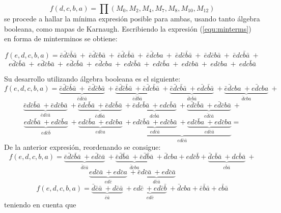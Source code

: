 \documentclass[a4paper]{article}
\begin{document}
\begin{equation}
f \left( d,c,b,a \right) = \prod \left( M_0,M_2,M_4,M_7,M_8,M_{10},M_{12} \right)
\label{equ:maxterms}
\end{equation}
se procede a hallar la mínima expresión posible para ambas, usando tanto álgebra booleana, como mapas de Karnaugh.
Escribiendo la expresión (\ref{equ:minterms}) en forma de minterminos se obtiene:
\begin{center}
\[
	f \left( e,d,c,b,a \right) = \bar{e}\bar{d}\bar{c}\bar{b}\bar{a} \ + \ \bar{e}\bar{d}\bar{c}b\bar{a} \ + \ \bar{e}\bar{d}c\bar{b}\bar{a} \ + \ \bar{e}\bar{d}cba \ + \ \bar{e}d\bar{c}\bar{b}\bar{a} \ + \ \bar{e}d\bar{c}b\bar{a} \ + \ \bar{e}dc\bar{b}\bar{a} \ +
\]
\[
	e\bar{d}\bar{c}\bar{b}\bar{a} \ + \ e\bar{d}\bar{c}b\bar{a} \ + \ e\bar{d}c\bar{b}\bar{a} \ + \ e\bar{d}cba \ + \ ed\bar{c}\bar{b}\bar{a}\ + \ ed\bar{c}\bar{b}a \ + \ ed\bar{c}b\bar{a} \ + \ ed\bar{c}ba \ + \ edc\bar{b}\bar{a} 
\]

Su desarrollo utilizando álgebra booleana es el siguiente:
\[
	f \left( e,d,c,b,a \right) = \underbrace{\bar{e}\bar{d}\bar{c}\bar{b}\bar{a} \ + \ \bar{e}\bar{d}\bar{c}b\bar{a} }_{\bar{e}\bar{d}\bar{c}\bar{a}}\ + 							\underbrace{\bar{e}\bar{d}\bar{c}\bar{b}\bar{a} \ + \bar{e}\bar{d}c\bar{b}  \bar{a}  }_{\bar{e}\bar{d}\bar{b}\bar{a}}\  +
				\underbrace{\bar{e}\bar{d} c \bar{b}\bar{a} \ + e \bar{d} c\bar{b}  \bar{a}  }_{\bar{d}c\bar{b}\bar{a}}\  +
				\underbrace{\bar{e}\bar{d} c b a \ + e \bar{d} c b a  }_{ \bar{d} c b a}\ +
\]
\[
				\underbrace{\bar{e} d  \bar{c} \bar{b} \bar{a} \ + \bar{e} d \bar{c} b \bar{a}  }_{ \bar{e} d \bar{c}  \bar{a}}\ +
				\underbrace{\bar{e} d  c \bar{b} \bar{a} \ + \bar{e} d \bar{c} \bar{b} \bar{a}  }_{ \bar{e} d \bar{b}  \bar{a}}\ +
				\underbrace{\bar{e} d  c \bar{b} \bar{a} \ + e d c \bar{b} \bar{a}  }_{  d c \bar{b}  \bar{a}}\ +
				\underbrace{e \bar{d} \bar{c} \bar{b} \bar{a} \ + e \bar{d} \bar{c} b \bar{a}  }_{  e\bar{d}  \bar{c}  \bar{a}}\ +
\]
\[
				\underbrace{e d \bar{c} \bar{b} \bar{a} \ + e d \bar{c} \bar{b} a }_{  e d  \bar{c}  \bar{b}}\ +
				\underbrace{e  d \bar{c} \bar{b} a \ + e d \bar{c} b a  }_{  ed  \bar{c}  a}\ +
				\underbrace{\underbrace{e d \bar{c} \bar{b} \bar{a} \ + e d \bar{c} b \bar{a}  }_{  ed  \bar{c}  \bar{a}}\ +
				\underbrace{e d \bar{c} \bar{b} a \ + e d \bar{c} b a  }_{ ed \bar{c}  \bar{a}}}_{  ed  \bar{c}  \bar{a}} =
\]
De la anterior expresión, reordenando se consigue:
\[
				f \left( e,d,c,b,a \right) =\underbrace{\bar{e} \bar{d} \bar{c} \bar{b} \bar{a} \ + e \bar{d} \bar{c} \bar{a}  }_{  \bar{d}  \bar{c}  \bar{a}}\ +
						\underbrace{\bar{e} \bar{d} \bar{b} \bar{a}  \ + \bar{e} \bar{d} \bar{b} \bar{a}  }_{  \bar{d}  c b a}\ +
						\bar{d} cba + ed\bar{c}\bar{b}+
						\underbrace{\bar{d} c \bar{b} \bar{a} \ + d c \bar{b} \bar{a}  }_{  c \bar{b} \bar{a}}\ +
\]
\[	
					\underbrace{e d  \bar{c} \bar{a} \ + e d \bar{c} a  }_{  ed \bar{c} }\ +
					\underbrace{\bar{e} d \bar{c} \bar{a} \ + e d \bar{c} \bar{a}  }_{  d \bar{c} \bar{a}}
\]
\[	
				f \left( e,d,c,b,a \right) =\underbrace{\bar{d}   \bar{c} \bar{a} \ + d  \bar{c} \bar{a}   }_{  \bar{c}\bar{a} }\ +
						\underbrace{e  d \bar{c} \ +e d  \bar{c} \bar{b}   }_{  e  d \bar{c}  }\ +\bar{d}cba+\bar{e}\bar{b}\bar{a}+c\bar{b}\bar{a}
\]
teniendo en cuenta que 


\end{center}
\end{document}
